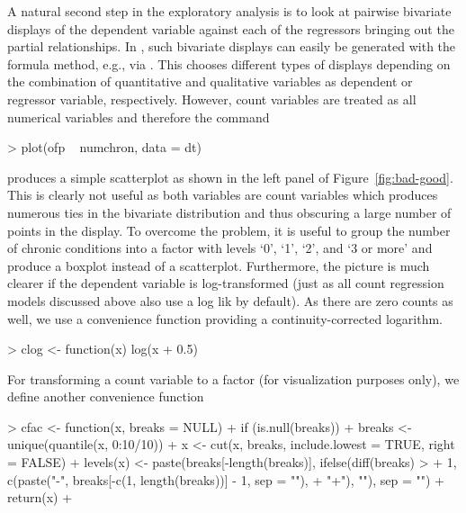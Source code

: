 \documentclass{Z}
\newcommand{\fct}[1]{\code{#1()}}
\begin{document}
A natural second step in the exploratory analysis is to look at pairwise bivariate 
displays of the dependent variable against each of the regressors bringing out the
partial relationships. In , such bivariate displays
can easily be generated with the formula \fct{plot} method, e.g., via .
This chooses different types of displays depending on the combination of quantitative
and qualitative variables as dependent or regressor variable, respectively. However,
count variables are treated as all numerical variables and therefore the command

\begin{Schunk}
\begin{Sinput}
> plot(ofp ~ numchron, data = dt)
\end{Sinput}
\end{Schunk}

produces a simple scatterplot as shown in the left panel of Figure~\ref{fig:bad-good}.
This is clearly not useful as both variables are count variables which produces numerous
ties in the bivariate distribution and thus obscuring a large number of points in
the display. To overcome the problem, it is useful to group the number of chronic
conditions into a factor with levels `0', `1', `2', and `3 or more' and produce a
boxplot instead of a scatterplot. Furthermore, the picture is much clearer if the
dependent variable is log-transformed (just as all count regression models discussed
above also use a log lik by default). As there are zero counts as well, we use a
convenience function \fct{clog} providing a continuity-corrected logarithm.

\begin{Schunk}
\begin{Sinput}
> clog <- function(x) log(x + 0.5)
\end{Sinput}
\end{Schunk}

For transforming a count variable to a factor (for visualization purposes only),
we define another convenience function \fct{cfac}

\begin{Schunk}
\begin{Sinput}
> cfac <- function(x, breaks = NULL) {
+     if (is.null(breaks)) 
+         breaks <- unique(quantile(x, 0:10/10))
+     x <- cut(x, breaks, include.lowest = TRUE, right = FALSE)
+     levels(x) <- paste(breaks[-length(breaks)], ifelse(diff(breaks) > 
+         1, c(paste("-", breaks[-c(1, length(breaks))] - 1, sep = ""), 
+         "+"), ""), sep = "")
+     return(x)
+ }
\end{Sinput}
\end{Schunk}
\end{document}
